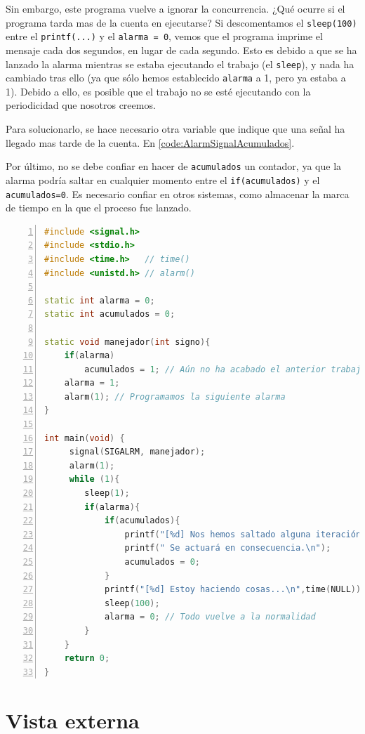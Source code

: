 Sin embargo, este programa vuelve a ignorar la concurrencia. ¿Qué ocurre si el programa tarda mas de la cuenta en 
ejecutarse? Si descomentamos el \texttt{sleep(100)} entre el \texttt{printf(...)} y el \texttt{alarma = 0}, vemos que 
el programa imprime el mensaje cada dos segundos, en lugar de cada segundo. Esto es debido a que se ha lanzado la 
alarma mientras se estaba ejecutando el trabajo (el \texttt{sleep}), y nada ha cambiado tras ello (ya que sólo hemos 
establecido \texttt{alarma} a 1, pero ya estaba a 1). Debido a ello, es posible que el trabajo no se esté ejecutando 
con la periodicidad que nosotros creemos.

Para solucionarlo, se hace necesario otra variable que indique que una señal ha llegado mas tarde de la cuenta. En 
\lstlistingname{} \ref{code:AlarmSignalAcumulados}. 

Por último, no se debe confiar en hacer de \texttt{acumulados} un contador, ya que la alarma podría saltar en cualquier 
momento entre el \texttt{if(acumulados)} y el \texttt{acumulados=0}. Es necesario confiar en otros sistemas, como 
almacenar la marca de tiempo en la que el proceso fue lanzado.

\begin{lstlisting}[language=C++,caption={Ejemplo de uso de \gls{SIGALRM} con detección de pérdidas}, breaklines=true, 
label=code:AlarmSignalAcumulados,numbers=left,float=htbp]
#include <signal.h>
#include <stdio.h>
#include <time.h>   // time()
#include <unistd.h> // alarm()

static int alarma = 0;
static int acumulados = 0;

static void manejador(int signo){
    if(alarma)
        acumulados = 1; // Aún no ha acabado el anterior trabajo
    alarma = 1;
    alarm(1); // Programamos la siguiente alarma
}

int main(void) {
     signal(SIGALRM, manejador);
     alarm(1);
     while (1){
        sleep(1);
        if(alarma){
            if(acumulados){
                printf("[%d] Nos hemos saltado alguna iteración.",time(NULL));
                printf(" Se actuará en consecuencia.\n");
                acumulados = 0;
            }
            printf("[%d] Estoy haciendo cosas...\n",time(NULL));
            sleep(100);
            alarma = 0; // Todo vuelve a la normalidad
        }
    }
    return 0;
}
\end{lstlisting}

\section{Vista externa}
